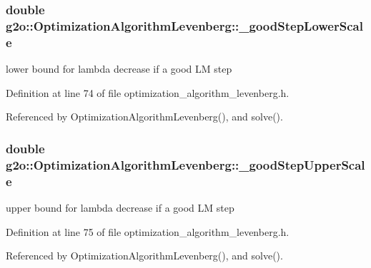 \subsubsection[{\texorpdfstring{\+\_\+good\+Step\+Lower\+Scale}{_goodStepLowerScale}}]{\setlength{\rightskip}{0pt plus 5cm}double g2o\+::\+Optimization\+Algorithm\+Levenberg\+::\+\_\+good\+Step\+Lower\+Scale\hspace{0.3cm}{\ttfamily [protected]}}\hypertarget{classg2o_1_1OptimizationAlgorithmLevenberg_a4951bc2e2fcca2c4eae4864690a4c087}{}\label{classg2o_1_1OptimizationAlgorithmLevenberg_a4951bc2e2fcca2c4eae4864690a4c087}


lower bound for lambda decrease if a good LM step 



Definition at line 74 of file optimization\+\_\+algorithm\+\_\+levenberg.\+h.



Referenced by Optimization\+Algorithm\+Levenberg(), and solve().

\subsubsection[{\texorpdfstring{\+\_\+good\+Step\+Upper\+Scale}{_goodStepUpperScale}}]{\setlength{\rightskip}{0pt plus 5cm}double g2o\+::\+Optimization\+Algorithm\+Levenberg\+::\+\_\+good\+Step\+Upper\+Scale\hspace{0.3cm}{\ttfamily [protected]}}\hypertarget{classg2o_1_1OptimizationAlgorithmLevenberg_a16d8b5540cd7ae0c132a565e3f49c021}{}\label{classg2o_1_1OptimizationAlgorithmLevenberg_a16d8b5540cd7ae0c132a565e3f49c021}


upper bound for lambda decrease if a good LM step 



Definition at line 75 of file optimization\+\_\+algorithm\+\_\+levenberg.\+h.



Referenced by Optimization\+Algorithm\+Levenberg(), and solve().

